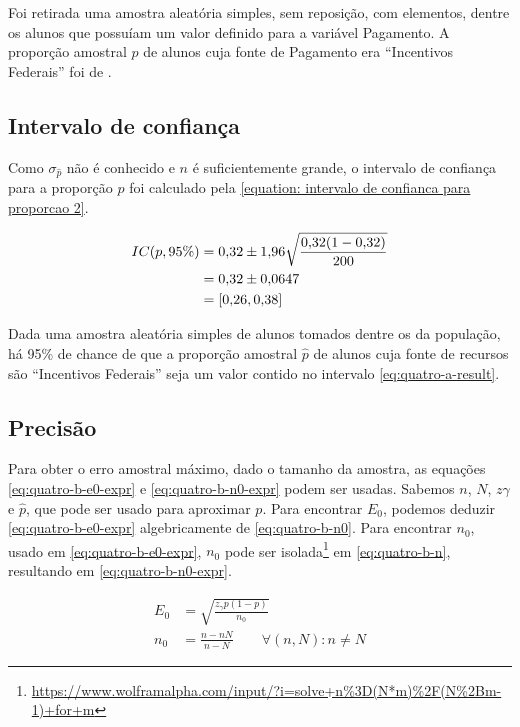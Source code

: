 

	Foi retirada uma amostra aleatória simples, sem reposição, com \QUATROn
	elementos, dentre os \QUATRON alunos que possuíam um valor definido para a
	variável Pagamento. A proporção amostral $\hat{p}$ de alunos cuja fonte de
	Pagamento era ``Incentivos Federais'' foi de \QUATROpAmostral.

\subsection{Intervalo de confiança}

	Como $\sigma_{\hat{p}}$ não é conhecido e $n$ é suficientemente grande,
	o intervalo de confiança para a proporção $p$ foi calculado pela
	\autoref{equation: intervalo de confianca para proporcao 2}.

	\begin{align} 
		IC(p, 95\%) &= \num{0.32} \pm \num{1.96} \sqrt{\frac{\num{0.32} (1- \num{0.32})}{200}} \nonumber \\
					&= \num{0.32} \pm \num{0.0647} \nonumber \\
					\label{eq:quatro-a-result}
					&= [\num{0.26}, \num{0.38}]
	\end{align}

	Dada uma amostra aleatória simples de \QUATROn alunos tomados dentre os
	\QUATRON da população, há 95\% de chance de que a proporção amostral $\hat{p}$ 
    de alunos cuja fonte de recursos são ``Incentivos Federais'' seja um valor 
    contido no intervalo \eqref{eq:quatro-a-result}.

\subsection{Precisão}

	Para obter o erro amostral máximo, dado o tamanho da amostra, as
	equações \eqref{eq:quatro-b-e0-expr} e \eqref{eq:quatro-b-n0-expr} podem
	ser usadas. Sabemos $n$, $N$, $z\gamma$ e $\hat{p}$, que pode ser usado para
	aproximar $p$. Para encontrar $E_0$, podemos deduzir
	\eqref{eq:quatro-b-e0-expr} algebricamente de \eqref{eq:quatro-b-n0}.
	Para encontrar $n_0$, usado em \eqref{eq:quatro-b-e0-expr}, $n_0$ pode
	ser isolada\footnote{\url{https://www.wolframalpha.com/input/?i=solve+n\%3D(N*m)\%2F(N\%2Bm-1)+for+m}}
    em \eqref{eq:quatro-b-n}, resultando em
	\eqref{eq:quatro-b-n0-expr}. 

	\begin{align}
		E_0 &= \label{eq:quatro-b-e0-expr}
			   \sqrt{\frac{z_\gamma p(1 - p) }{n_0}} \\
		n_0 &= \label{eq:quatro-b-n0-expr}
			   \frac{n-n N}{n-N} \qquad \forall (n, N) : n \neq N
	\end{align}

